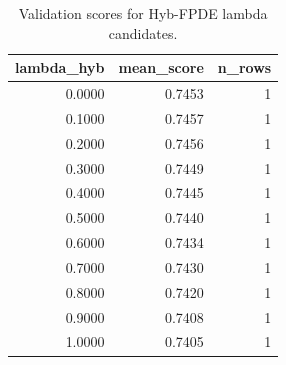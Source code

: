 \begin{table}[t]
\caption{Validation scores for Hyb-FPDE lambda candidates.}
\label{tab:lambda_distribution_computed}
\centering
\begin{tabular}{rrr}
\toprule
lambda\_hyb & mean\_score & n\_rows \\
\midrule
0.0000 & 0.7453 & 1 \\
0.1000 & 0.7457 & 1 \\
0.2000 & 0.7456 & 1 \\
0.3000 & 0.7449 & 1 \\
0.4000 & 0.7445 & 1 \\
0.5000 & 0.7440 & 1 \\
0.6000 & 0.7434 & 1 \\
0.7000 & 0.7430 & 1 \\
0.8000 & 0.7420 & 1 \\
0.9000 & 0.7408 & 1 \\
1.0000 & 0.7405 & 1 \\
\bottomrule
\end{tabular}

\end{table}
